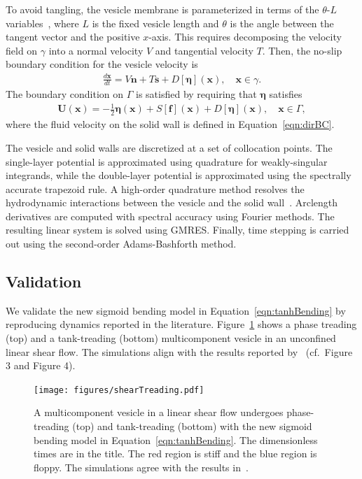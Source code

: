\documentclass[twoside,twocolumn,9pt]{article}
\newcommand{\ff}{\mathbf{f}}
\newcommand{\eeta}{\boldsymbol{\eta}}
\newcommand{\nn}{\mathbf{n}}
\renewcommand{\ss}{\mathbf{s}}
\newcommand{\UU}{\mathbf{U}}
\newcommand{\xx}{\mathbf{x}}
\begin{document}
To avoid tangling, the vesicle membrane is parameterized in terms of the
$\theta$-$L$ variables~\cite{hou-low-she1994}, where $L$ is the fixed
vesicle length and $\theta$ is the angle between the tangent vector and
the positive $x$-axis. This requires decomposing the velocity field on
$\gamma$ into a normal velocity $V$ and tangential velocity $T$. Then,
the no-slip boundary condition for the vesicle velocity is
\begin{align}
  \frac{d\xx}{dt} = V \nn + T \ss + D[\eeta](\xx), \quad \xx \in \gamma.
\end{align}
The boundary condition on $\Gamma$ is satisfied by requiring that
$\eeta$ satisfies
\begin{align}
  \UU(\xx) = -\frac{1}{2}\eeta(\xx) + 
    S[\ff](\xx) + D[\eeta](\xx), \quad \xx \in \Gamma,
  \label{eqn:DLP_BIE}
\end{align}
where the fluid velocity on the solid wall is defined in
Equation~\eqref{eqn:dirBC}.

The vesicle and solid walls are discretized at a set of collocation
points. The single-layer potential is approximated using quadrature for
weakly-singular integrands, while the double-layer potential is
approximated using the spectrally accurate trapezoid rule. A high-order
quadrature method resolves the hydrodynamic interactions between the
vesicle and the solid wall~\cite{qua-bir2014}. Arclength derivatives are
computed with spectral accuracy using Fourier methods. The resulting
linear system is solved using GMRES. Finally, time stepping is carried
out using the second-order Adams-Bashforth method. 


\subsection{Validation}
\label{sec:validation}
We validate the new sigmoid bending model in
Equation~\eqref{eqn:tanhBending} by reproducing dynamics reported in the
literature. Figure~\ref{fig:treading} shows a phase treading (top) and a
tank-treading (bottom) multicomponent vesicle in an unconfined linear
shear flow. The simulations align with the results reported
by~\citet{liu-mar-li-vee-low2017} (cf.~Figure 3 and Figure 4).
\begin{figure}[h]
  \centering
  \texttt{[image: figures/shearTreading.pdf]}
  \caption{\label{fig:treading} \small A multicomponent vesicle in a
  linear shear flow undergoes phase-treading (top) and tank-treading
  (bottom) with the new sigmoid bending model in
  Equation~\eqref{eqn:tanhBending}. The dimensionless times are in the
  title. The red region is stiff and the blue region is floppy. The
  simulations agree with the results
  in~\citet{liu-mar-li-vee-low2017}.}
\end{figure}
\end{document}
